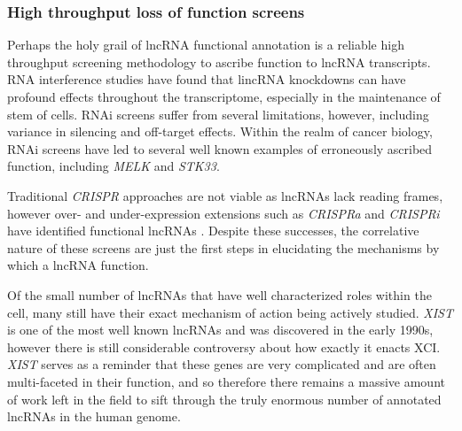 \subsubsection{High throughput loss of function screens}
Perhaps the holy grail of lncRNA functional annotation is a reliable high throughput screening methodology to ascribe function to lncRNA transcripts. RNA interference studies have found that lincRNA knockdowns can have profound effects throughout the transcriptome, especially in the maintenance of stem of cells. RNAi screens suffer from several limitations, however, including variance in silencing and off-target effects. Within the realm of cancer biology, RNAi screens have led to several well known examples of erroneously ascribed function, including \emph{MELK} and \emph{STK33}.

Traditional \emph{CRISPR} approaches are not viable as lncRNAs lack reading frames, however over- and under-expression extensions such as \emph{CRISPRa} and \emph{CRISPRi} have identified functional lncRNAs \cite{Cai2020AHomeostasis}. Despite these successes, the correlative nature of these screens are just the first steps in elucidating the mechanisms by which a lncRNA function. 

Of the small number of lncRNAs that have well characterized roles within the cell, many still have their exact mechanism of action being actively studied. \emph{XIST} is one of the most well known lncRNAs and was discovered in the early 1990s, however there is still considerable controversy about how exactly it enacts XCI. \emph{XIST} serves as a reminder that these genes are very complicated and are often multi-faceted in their function, and so therefore there remains a massive amount of work left in the field to sift through the truly enormous number of annotated lncRNAs in the human genome.